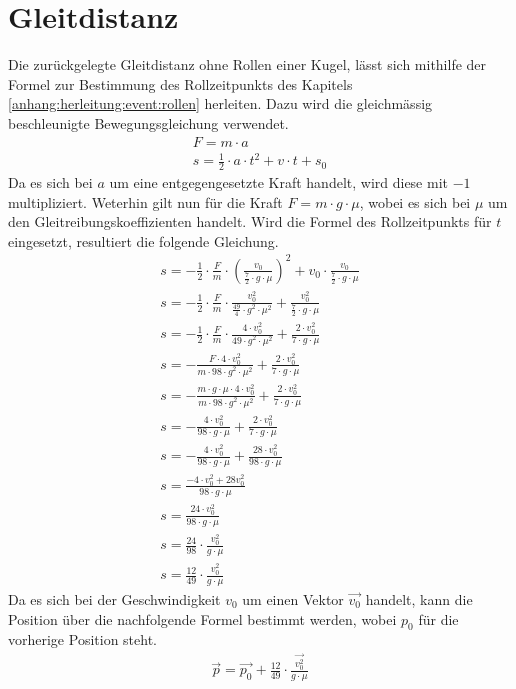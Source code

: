 \section{Gleitdistanz}\label{anhang:herleitung:gleitdistanz}
Die zurückgelegte Gleitdistanz ohne Rollen einer Kugel, lässt sich mithilfe der Formel zur Bestimmung des Rollzeitpunkts
des Kapitels \ref{anhang:herleitung:event:rollen} herleiten.
Dazu wird die gleichmässig beschleunigte Bewegungsgleichung verwendet.
\begin{align}
    F = m \cdot a\\
    s = \frac{1}{2} \cdot a \cdot t^2 + v \cdot t + s_0
\end{align}
Da es sich bei $a$ um eine entgegengesetzte Kraft handelt, wird diese mit $-1$ multipliziert. Weterhin gilt nun für die
Kraft $F = m \cdot g \cdot \mu$, wobei es sich bei $\mu$ um den Gleitreibungskoeffizienten handelt. Wird die Formel des Rollzeitpunkts
für $t$ eingesetzt, resultiert die folgende Gleichung.
\begin{align}
    s = -\frac{1}{2} \cdot \frac{F}{m} \cdot (\frac{v_0}{\frac{7}{2} \cdot g \cdot \mu})^2 + v_0 \cdot \frac{v_0}{\frac{7}{2} \cdot g \cdot \mu}\\
    s = -\frac{1}{2} \cdot \frac{F}{m} \cdot \frac{v_0^2}{\frac{49}{4} \cdot g^2 \cdot \mu^2} + \frac{v_0^2}{\frac{7}{2} \cdot g \cdot \mu}\\
    s = -\frac{1}{2} \cdot \frac{F}{m} \cdot \frac{4 \cdot v_0^2}{49 \cdot g^2 \cdot \mu^2} + \frac{2 \cdot v_0^2}{7 \cdot g \cdot \mu}\\
    s = -\frac{F \cdot 4 \cdot v_0^2}{m \cdot 98 \cdot g^2 \cdot \mu^2} + \frac{2 \cdot v_0^2}{7 \cdot g \cdot \mu}\\
    s = -\frac{m \cdot g \cdot \mu \cdot 4 \cdot v_0^2}{m \cdot 98 \cdot g^2 \cdot \mu^2} + \frac{2 \cdot v_0^2}{7 \cdot g \cdot \mu}\\
    s = -\frac{4 \cdot v_0^2}{98 \cdot g \cdot \mu} + \frac{2 \cdot v_0^2}{7 \cdot g \cdot \mu}\\
    s = -\frac{4 \cdot v_0^2}{98 \cdot g \cdot \mu} + \frac{28 \cdot v_0^2}{98 \cdot g \cdot \mu}\\
    s = \frac{-4 \cdot v_0^2 + 28 v_0^2}{98 \cdot g \cdot \mu}\\
    s = \frac{24 \cdot v_0^2}{98 \cdot g \cdot \mu}\\
    s = \frac{24}{98} \cdot \frac{v_0^2}{g \cdot \mu}\\
    s = \frac{12}{49} \cdot \frac{v_0^2}{g \cdot \mu}
\end{align}
Da es sich bei der Geschwindigkeit $v_0$ um einen Vektor $\vec{v_0}$ handelt, kann die Position
über die nachfolgende Formel bestimmt werden, wobei $p_0$ für die vorherige Position steht.
\begin{align}
    \vec{p} = \vec{p_0} + \frac{12}{49} \cdot \frac{\vec{v_0^2}}{g \cdot \mu}
\end{align}